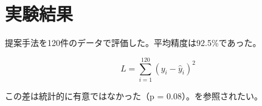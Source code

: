 \section{実験結果}

提案手法を120件のデータで評価した。平均精度は92.5\%であった。

\begin{equation}
L = \sum_{i=1}^{120}(y_i-\hat{y}_i)^2
\end{equation}

この差は統計的に有意ではなかった（p = 0.08）。\cite{smith2024}を参照されたい。
